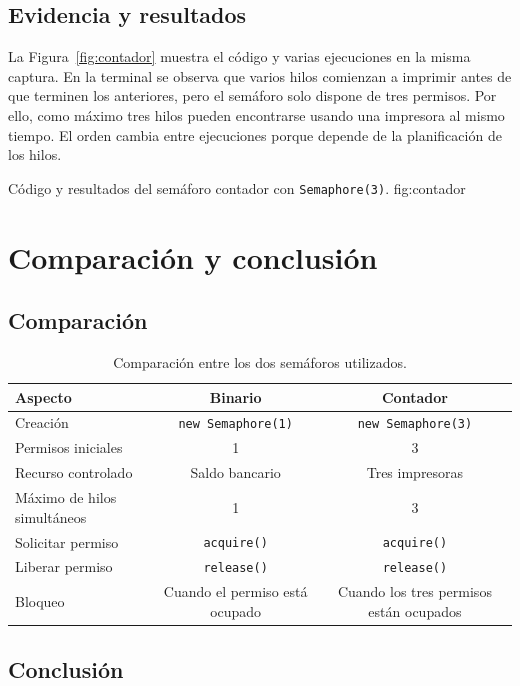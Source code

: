 \documentclass[12pt,oneside]{template/liverpoolthesis}
\begin{document}
\section{Evidencia y resultados}

La Figura~\ref{fig:contador} muestra el código y varias ejecuciones en la misma
captura. En la terminal se observa que varios hilos comienzan a imprimir antes
de que terminen los anteriores, pero el semáforo solo dispone de tres permisos.
Por ello, como máximo tres hilos pueden encontrarse usando una impresora al
mismo tiempo. El orden cambia entre ejecuciones porque depende de la
planificación de los hilos.

  {Código y resultados del semáforo contador con \texttt{Semaphore(3)}.}
  {fig:contador}

\chapter{Comparación y conclusión}

\section{Comparación}

\begin{table}[H]
\centering
\caption{Comparación entre los dos semáforos utilizados.}
\begin{tabularx}{\textwidth}{P{4.2cm} C C}
\toprule
\textbf{Aspecto} & \textbf{Binario} & \textbf{Contador}\\
\midrule
Creación & \texttt{new Semaphore(1)} & \texttt{new Semaphore(3)}\\
Permisos iniciales & 1 & 3\\
Recurso controlado & Saldo bancario & Tres impresoras\\
Máximo de hilos simultáneos & 1 & 3\\
Solicitar permiso & \texttt{acquire()} & \texttt{acquire()}\\
Liberar permiso & \texttt{release()} & \texttt{release()}\\
Bloqueo & Cuando el permiso está ocupado & Cuando los tres permisos están ocupados\\
\bottomrule
\end{tabularx}
\end{table}

\section{Conclusión}
\end{document}
